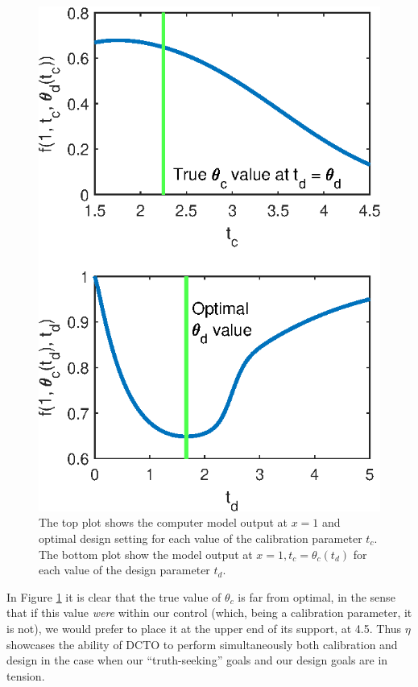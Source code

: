 \documentclass[10pt]{asme2ej}
\begin{document}
\begin{figure}
	\centering
	\includegraphics[scale=0.85]{figures/figure_3.eps}
	\captionsetup{width=.85\linewidth}
	\caption{The top plot shows the computer model output at $x=1$ and optimal design setting for each value of the calibration parameter $t_c$. The bottom plot show the model output at $x=1,t_c=\theta_c(t_d)$ for each value of the design parameter $t_d$.}
	\label{fig:true_vals}
\end{figure}
%
In Figure \ref{fig:true_vals} it is clear that the true value of $\theta_c$ is far from optimal, in the sense that if this value \textit{were} within our control (which, being a calibration parameter, it is not), we would prefer to place it at the upper end of its support, at 4.5.
%
Thus $\eta$ showcases the ability of DCTO to perform simultaneously both calibration and design in the case when our ``truth-seeking'' goals and our design goals are in tension.
%
\end{document}

